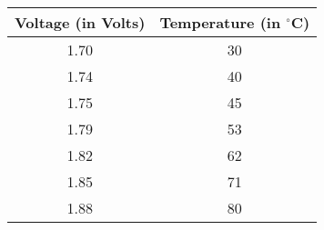 
\begin{center}
\begin{tabular}{|c|c|}
\hline
\textbf{Voltage (in Volts)} & \textbf{Temperature (in $^{\circ}$C)}  \\ \hline
1.70  & 30\\ \hline
1.74  & 40\\ \hline
1.75  & 45\\ \hline
1.79  & 53\\ \hline
1.82  & 62\\ \hline
1.85  & 71\\ \hline
1.88  & 80\\ \hline
\end{tabular}
\end{center}
